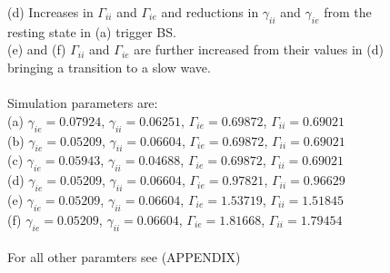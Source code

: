 \documentclass[a4paper,12pt]{article}
\begin{document}
\begin{figure}
{(d) Increases in $\Gamma_{ii}$ and $\Gamma_{ie}$ and reductions in $\gamma_{ii}$ and $\gamma_{ie}$ from the resting state in (a) trigger BS. \\
(e) and (f) $\Gamma_{ii}$ and $\Gamma_{ie}$ are further increased from their values in (d) bringing a transition to a slow wave.\\
\\
Simulation parameters are:\\
(a) $\gamma_{ie} = 0.07924$, $\gamma_{ii} = 0.06251$, $\Gamma_{ie} = 0.69872$, $\Gamma_{ii} = 0.69021$\\
(b) $\gamma_{ie} = 0.05209$, $\gamma_{ii} = 0.06604$, $\Gamma_{ie} = 0.69872$, $\Gamma_{ii} = 0.69021$\\
(c) $\gamma_{ie} = 0.05943$, $\gamma_{ii} = 0.04688$, $\Gamma_{ie} = 0.69872$, $\Gamma_{ii} = 0.69021$\\
(d) $\gamma_{ie} = 0.05209$, $\gamma_{ii} = 0.06604$, $\Gamma_{ie} = 0.97821$, $\Gamma_{ii} = 0.96629$\\
(e) $\gamma_{ie} = 0.05209$, $\gamma_{ii} = 0.06604$, $\Gamma_{ie} = 1.53719$, $\Gamma_{ii} = 1.51845$\\
(f) $\gamma_{ie} = 0.05209$, $\gamma_{ii} = 0.06604$, $\Gamma_{ie} = 1.81668$, $\Gamma_{ii} = 1.79454$\\
\\
For all other paramters see (APPENDIX)}
\end{figure}
\end{document}
